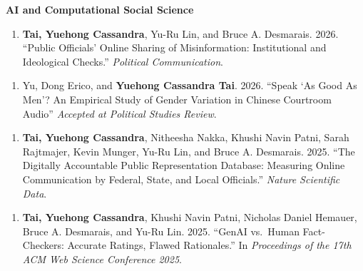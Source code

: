 \documentclass[10.5pt,]{article}
\providecommand{\tightlist}{%
	\setlength{\itemsep}{0pt}\setlength{\parskip}{0pt}}
\renewenvironment{itemize}{
	\begin{list}{}{
			\setlength{\leftmargin}{1.5em}
		}
	}{
	\end{list}
}
\begin{document}
\begin{itemize}
\tightlist
\item
  \textbf{AI and Computational Social Science}

  \begin{itemize}
  \tightlist
  \item
    \begin{enumerate}
    \def\labelenumi{\arabic{enumi}.}
    \setcounter{enumi}{15}
    \tightlist
    \item
      \textbf{Tai, Yuehong Cassandra}, Yu-Ru Lin, and Bruce A.
      Desmarais. 2026. ``Public Oﬀicials' Online Sharing of
      Misinformation: Institutional and Ideological Checks.''
      \emph{Political Communication}.
    \end{enumerate}
  \item
    \begin{enumerate}
    \def\labelenumi{\arabic{enumi}.}
    \setcounter{enumi}{14}
    \tightlist
    \item
      Yu, Dong Erico, and \textbf{Yuehong Cassandra Tai}. 2026. ``Speak
      `As Good As Men'? An Empirical Study of Gender Variation in
      Chinese Courtroom Audio'' \emph{Accepted at Political Studies
      Review}.
    \end{enumerate}
  \item
    \begin{enumerate}
    \def\labelenumi{\arabic{enumi}.}
    \setcounter{enumi}{13}
    \tightlist
    \item
      \textbf{Tai, Yuehong Cassandra}, Nitheesha Nakka, Khushi Navin
      Patni, Sarah Rajtmajer, Kevin Munger, Yu-Ru Lin, and Bruce A.
      Desmarais. 2025. ``The Digitally Accountable Public Representation
      Database: Measuring Online Communication by Federal, State, and
      Local Oﬀicials.'' \emph{Nature Scientific Data}.
    \end{enumerate}
  \item
    \begin{enumerate}
    \def\labelenumi{\arabic{enumi}.}
    \setcounter{enumi}{12}
    \tightlist
    \item
      \textbf{Tai, Yuehong Cassandra}, Khushi Navin Patni, Nicholas
      Daniel Hemauer, Bruce A. Desmarais, and Yu-Ru Lin. 2025. ``GenAI
      vs.~Human Fact-Checkers: Accurate Ratings, Flawed Rationales.'' In
      \emph{Proceedings of the 17th ACM Web Science Conference 2025}.
    \end{enumerate}
  \item
    \begin{enumerate}

\end{enumerate}
\end{itemize}
\end{itemize}
\end{document}
